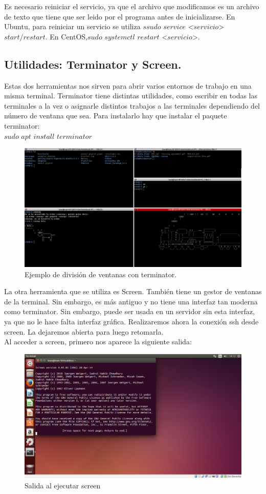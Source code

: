 Es necesario reiniciar el servicio, ya que el archivo que modificamos es un archivo de texto que tiene que ser leido por el programa antes de inicializarse. En Ubuntu, para reiniciar un servicio se utiliza $ssudo$ $service$ <$servicio$>  $start/restart$. En CentOS,$sudo$ $systemctl$ $restart$ <$servicio$>.

\subsection{Utilidades: Terminator y Screen.}

Estas dos herramientas nos sirven para abrir varios entornos de trabajo en una misma terminal. Terminator\cite{terminator} tiene distintas utilidades, como escribir en todas las terminales a la vez o asignarle distintos trabajos a las terminales dependiendo del número de ventana que sea. Para instalarlo hay que instalar el paquete terminator:\\
	
$sudo$ $apt$ $install$ $terminator$\\
	
	
\begin{figure}[H]
	\centering
	\includegraphics[width=0.7\linewidth]{terminator}
	\caption[Uso de terminator]{Ejemplo de división de ventanas con terminator.}
	\label{fig:terminator}
\end{figure}
	
La otra herramienta que se utiliza es Screen\cite{screen}. También tiene un gestor de ventanas de la terminal. Sin embargo, es más antiguo y no tiene una interfaz tan moderna como terminator. Sin embargo, puede ser usada en un servidor sin esta interfaz, ya que no le hace falta interfaz gráfica. Realizaremos ahora la conexión ssh desde screen. La dejaremos abierta para luego retomarla. \\

Al acceder a screen, primero nos aparece la siguiente salida:\\
\begin{figure}[H]
	\centering
	\includegraphics[width=0.7\linewidth]{ScreenConexion1}
	\caption[Screen conexión]{Salida al ejecutar screen}
	\label{fig:ScreenConexion1}
\end{figure}

